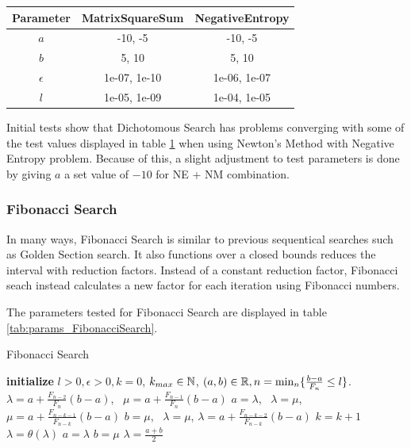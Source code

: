 \documentclass[a4paper,english,titlepage,12pt]{article}
\newcommand{\R}{\ensuremath\mathbb{R}}
\newcommand{\N}{\ensuremath\mathbb{N}}
\begin{document}
\begin{table}[H]
\label{tab:params_DichotomousSearch}
\centering
{}
\begin{tabular}{|c|c|c|}
\hline
\rowcolor{gray!25}
Parameter & MatrixSquareSum & NegativeEntropy \\
\hline
$a$ & -10, -5 & -10, -5 \\
$b$ & 5, 10 & 5, 10 \\
$\epsilon$ & 1e-07, 1e-10 & 1e-06, 1e-07 \\
$l$ & 1e-05, 1e-09 & 1e-04, 1e-05 \\
\hline
\end{tabular}
\end{table}

Initial tests show that Dichotomous Search has problems converging with some of the test values displayed in table \ref{tab:params_DichotomousSearch} when using Newton's Method with Negative Entropy problem. Because of this, a slight adjustment to test parameters is done by giving $a$ a set value of $-10$ for NE + NM combination.


\subsubsection{Fibonacci Search}

In many ways, Fibonacci Search is similar to previous sequentical searches such as Golden Section search. It also functions over a closed bounds reduces the interval with reduction factors. Instead of a constant reduction factor, Fibonacci seach instead calculates a new factor for each iteration using Fibonacci numbers. \cite{book:nonlinear_programming}

The parameters tested for Fibonacci Search are displayed in table \ref{tab:params_FibonacciSearch}.

\begin{algorithm}[H]
\caption{Fibonacci Search}
\label{alg_fibonacci}
\begin{algorithmic}[1]
\STATE \textbf{initialize} $l > 0, \epsilon > 0, k = 0$, $k_{max} \in \N$, $(a, b) \in \R, n = \mathrm{min}_n \{ \frac{b - a}{F_n} \leq l \}$.
\STATE $\lambda = a + \frac{F_{n-2}}{F_n} (b - a)$, \  $\mu = a + \frac{F_{n-1}}{F_n} (b - a)$
    \IF{$\theta(\lambda) < \theta(\mu)$}
        \STATE $a = \lambda$, \ $\lambda = \mu$, $\mu = a + \frac{F_{n-k-1}}{F_{n-k}} (b - a)$
    \ELSE
        \STATE $b = \mu$, \ $\lambda = \mu$, $\lambda = a + \frac{F_{n-k-2}}{F_{n-k}} (b - a)$
    \ENDIF
    \STATE $k = k + 1$
\ENDWHILE
\STATE $\lambda = \theta(\lambda)$
\IF{$\theta(\lambda) > \theta(\mu + \epsilon)$}
    \STATE $a = \lambda$
\ELSE
    \STATE $b = \mu$
\ENDIF
\RETURN $\lambda = \frac{a + b}{2}$
\end{algorithmic}
\end{algorithm}
\end{document}
